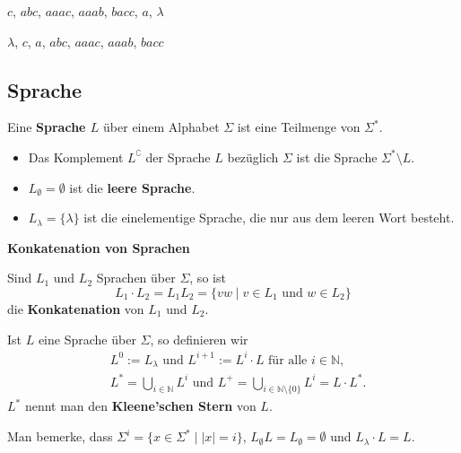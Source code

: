 \documentclass[a4paper, 11pt]{article}
\def\N{\mathbb{N}}
\newcommand\myTitle[1]{{\large \textbf {#1}}}
\begin{document}
	$c$, $abc$, $aaac$, $aaab$, $bacc$, $a$, $\lambda$

	
	$\lambda$, $c$, $a$, $abc$, $aaac$, $aaab$, $bacc$



\subsection{Sprache}


	
	\begin{mainbox}{}
	 Eine \textbf{Sprache $L$} über einem Alphabet $\Sigma$ ist eine Teilmenge von $\Sigma^*$. 
	\end{mainbox}
	\begin{itemize}[label=-]
		\item Das Komplement \textbf{$L^\complement$} der Sprache $L$ bezüglich $\Sigma$ ist die Sprache $\Sigma^* \setminus L$.
		\item $L_\emptyset = \emptyset$ ist die \textbf{leere Sprache}.
		\item $L_\lambda = \{\lambda\}$ ist die einelementige Sprache, die nur aus dem leeren Wort besteht.
	\end{itemize}
	
	\myTitle{Konkatenation von Sprachen}
	\begin{mainbox}{}
		Sind $L_1$ und $L_2$ Sprachen über $\Sigma$, so ist 
		$$L_1 \cdot L_2 = L_1L_2 = \{vw \mid v \in L_1 \text{ und } w \in L_2\}$$
		die \textbf{Konkatenation} von $L_1$ und $L_2$. 
	\end{mainbox}



	\begin{mainbox}{}
		Ist $L$ eine Sprache über $\Sigma$, so definieren wir
		\begin{align*}
			&L^0 := L_{\lambda} \text{ und } L^{i+1} := L^{i}\cdot L \text{ für alle } i \in \N,\\
			&L^* = \bigcup_{i \in \N}L^i \text{ und } L^+ = \bigcup_{i \in \N \setminus \{0\}} L^i = L \cdot L^*.
		\end{align*}
		$L^*$ nennt man den \textbf{Kleene'schen Stern} von $L$.
	\end{mainbox}
	Man bemerke, dass $\Sigma^i = \{x \in \Sigma^* \mid |x| = i\}$, $L_\emptyset L = L_\emptyset = \emptyset$ und $L_\lambda \cdot L = L$.
	
\end{document}
